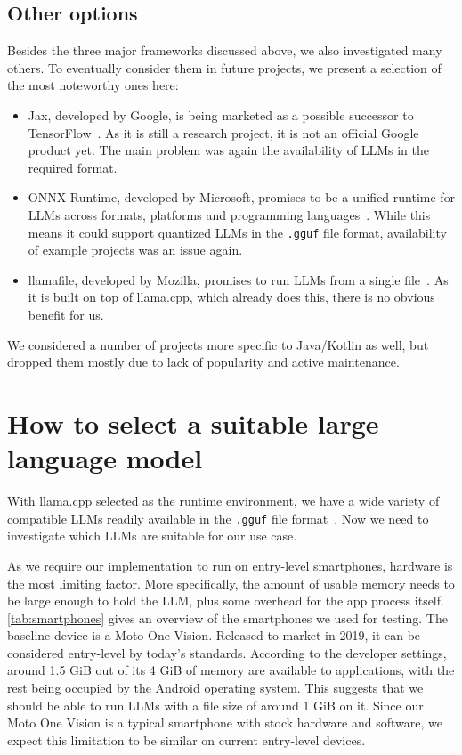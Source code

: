 \subsection{Other options}
\label{sec:otherOptions}
Besides the three major frameworks discussed above, we also investigated many others. To eventually consider them in future projects, we present a selection of the most noteworthy ones here:
\begin{itemize}
	\item Jax, developed by Google, is being marketed as a possible successor to TensorFlow~\cite{jaxJaxmlJax2025}. As it is still a research project, it is not an official Google product yet. The main problem was again the availability of \glspl{LLM} in the required format.
	\item ONNX Runtime, developed by Microsoft, promises to be a unified runtime for \glspl{LLM} across formats, platforms and programming languages~\cite{onnxruntimedevelopersONNXRuntime2018,onnxruntimeONNXRuntimeHome}. While this means it could support quantized \glspl{LLM} in the \lstinline|.gguf| file format, availability of example projects was an issue again.
	\item llamafile, developed by Mozilla, promises to run \glspl{LLM} from a single file~\cite{mozillaMozillaOchoLlamafile2025,hoodIntroducingLlamafileMozilla2023}. As it is built on top of llama.cpp, which already does this, there is no obvious benefit for us.
\end{itemize}

We considered a number of projects more specific to Java/Kotlin as well, but dropped them mostly due to lack of popularity and active maintenance.

\section{How to select a suitable large language model}
\label{sec:howToSelectASuitableLLM}
With llama.cpp selected as the runtime environment, we have a wide variety of compatible \glspl{LLM} readily available in the \lstinline|.gguf| file format~\cite{huggingfaceModelsHuggingFace2025}. Now we need to investigate which \glspl{LLM} are suitable for our use case.

As we require our implementation to run on entry-level smartphones, hardware is the most limiting factor. More specifically, the amount of usable memory needs to be large enough to hold the \gls{LLM}, plus some overhead for the app process itself. \cref{tab:smartphones} gives an overview of the smartphones we used for testing. The baseline device is a Moto One Vision. Released to market in 2019, it can be considered entry-level by today's standards. According to the developer settings, around 1.5 GiB out of its 4 GiB of memory are available to applications, with the rest being occupied by the Android operating system. This suggests that we should be able to run \glspl{LLM} with a file size of around 1 GiB on it. Since our Moto One Vision is a typical smartphone with stock hardware and software, we expect this limitation to be similar on current entry-level devices.

